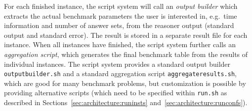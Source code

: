 \documentclass[a4paper]{article}
\begin{document}
		For each finished instance, the script system will call an \emph{output builder}
		which extracts the actual benchmark parameters the user is interested in,
		e.g.~time information and number of answer sets,
		from the reasoner output (standard output and standard error).
		The result is stored in a separate result file for each instance.
		When all instances have finished, the script system further calls an \emph{aggregation script},
		which generates the final benchmark table from the results of individual instances.
		The script system provides a standard output builder {\tt outputbuilder.sh} and a standard aggregation script {\tt aggregateresults.sh},
		which are good for many benchmark problems, but customization is possible by providing alternative scripts
		(which need to be specified within {\tt run.sh} as described in Sections~\ref{sec:architecture:runinsts} and~\ref{sec:architecture:runconfs}).
\end{document}
